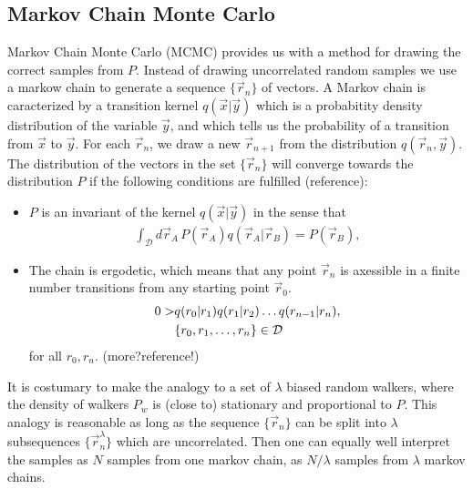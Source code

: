 \documentclass[a4paper,10pt,twocolumn]{article} %
\begin{document}
\subsection{Markov Chain Monte Carlo}%

Markov Chain Monte Carlo (MCMC) provides us with a method for drawing the correct samples from $P$. 
Instead of drawing uncorrelated random samples we use a markow chain to generate a sequence $\{\vec r_n\}$ of vectors.
A Markov chain is caracterized by a transition kernel $q(\vec x|\vec y)$ which is a probabitity density distribution 
of the variable $\vec y$, and which tells us the probability of a transition from $\vec x$ to $\vec y$.
For each $\vec r_n$, we draw a new $\vec r_{n+1}$ from the distribution $q(\vec r_n,\vec y)$. The distribution 
of the vectors in the set 
$\{\vec r_n\}$ will converge towards the distribution $P$ if the following 
conditions are fulfilled (reference):
\begin{itemize}
\item
	$P$ is an invariant of the kernel $q(\vec x|\vec y)$ in the sense that 
	\begin{align}
	\int_{\mathcal D} d\vec r_A\, P(\vec r_A) q(\vec r_A | \vec r_B) = P(\vec r_B) \label{eq221},
	\end{align}
\item
	The chain is ergodetic, which means that any point $\vec r_n$ is axessible in a finite number transitions from any starting point $\vec r_0$. 
	\begin{align}
		0>&q(r_0|r_1)q(r_1|r_2)\dots q(r_{n-1}|r_n),\notag\\
		&\{r_0,r_1,\dots,r_n\}\in\mathcal D 
	\end{align}
	for all $r_0,r_n$. 	
	(more?reference!)
\end{itemize}

%
%
It is costumary to make the analogy to a set of $\lambda$ biased random walkers, where
the density of walkers $P_w$ is (close to) stationary and proportional to $P$.
This analogy is reasonable as long as the sequence $\{\vec r_n\}$ can be split into $\lambda$ 
subsequences $\{\vec r_n^\lambda\}$ which are uncorrelated. Then one can equally well interpret the samples as $N$ samples
from one markov chain, as $N/\lambda$ samples from $\lambda$ markov chains.
\end{document}
